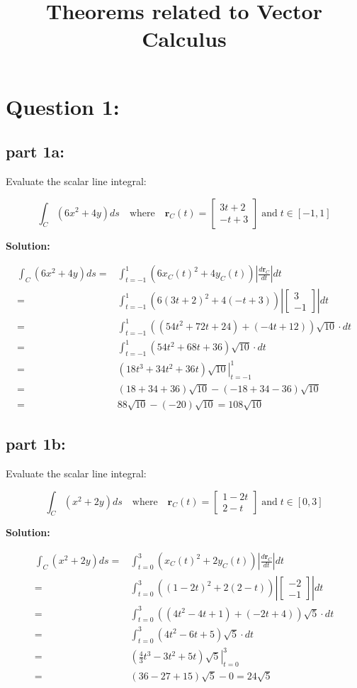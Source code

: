 \documentclass{article}
\title{Theorems related to Vector Calculus}
\date{}
\newcommand{\abs}[1]{\left|#1\right|}
\newcommand{\colxyvec}[2]{\begin{bmatrix} #1 \\ #2 \end{bmatrix}}
\newcommand{\at}[1]{\left. #1 \right|}
\newcommand{\dr}[1]{\textcolor{dark_red}{#1}}
\begin{document}
\maketitle


\section*{Question 1:}

\subsection*{part 1a:}

Evaluate the scalar line integral: 

\[\int_C (6x^2 + 4y)ds \quad\text{where}\quad \mathbf{r}_C(t) = \colxyvec{3t + 2}{-t + 3} \;\text{and}\; t \in [-1,1]\]

\vspace{5mm}
\dr{\textbf{Solution:}}

\dr{\begin{align*}
\int_C (6x^2 + 4y)ds = & \int_{t=-1}^1 (6x_C(t)^2 + 4y_C(t))\abs{\frac{d\mathbf{r}_C}{dt}}dt \\
= & \int_{t=-1}^1 (6(3t+2)^2 + 4(-t+3))\abs{\colxyvec{3}{-1}}dt \\
= & \int_{t=-1}^1 ((54t^2 + 72t + 24) + (-4t+12))\sqrt{10} \cdot dt \\
= & \int_{t=-1}^1 (54t^2 + 68t + 36)\sqrt{10} \cdot dt \\
= & \at{(18t^3 + 34t^2 + 36t)\sqrt{10}}_{t=-1}^1 \\
= & (18 + 34 + 36)\sqrt{10} - (-18 + 34 - 36)\sqrt{10} \\
= & 88\sqrt{10} - (-20)\sqrt{10} 
= 108\sqrt{10}
\end{align*}}



\subsection*{part 1b:}

Evaluate the scalar line integral: 

\[\int_C (x^2 + 2y)ds \quad\text{where}\quad \mathbf{r}_C(t) = \colxyvec{1 - 2t}{2 - t} \;\text{and}\; t \in [0,3]\]

\vspace{5mm}
\dr{\textbf{Solution:}}

\dr{\begin{align*}
\int_C (x^2 + 2y)ds = & \int_{t=0}^3 (x_C(t)^2 + 2y_C(t))\abs{\frac{d\mathbf{r}_C}{dt}}dt \\
= & \int_{t=0}^3 ((1-2t)^2 + 2(2-t))\abs{\colxyvec{-2}{-1}}dt \\
= & \int_{t=0}^3 ((4t^2 - 4t + 1) + (-2t + 4))\sqrt{5} \cdot dt \\
= & \int_{t=0}^3 (4t^2 - 6t + 5)\sqrt{5} \cdot dt \\
= & \at{(\frac{4}{3}t^3 - 3t^2 + 5t)\sqrt{5}}_{t=0}^3 \\
= & (36 - 27 + 15)\sqrt{5} - 0 
= 24\sqrt{5}
\end{align*}}
\end{document}
